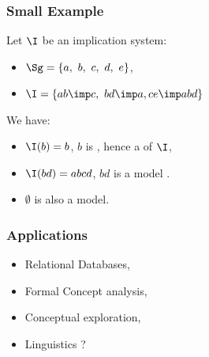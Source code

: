 \begin{frame}
\frametitle{Small Example}

Let $\I$ be an implication system:
\begin{itemize}
	\item $\Sg = \{ a, \ b, \ c, \ d, \ e \}$,
	\item $\I = \{ ab \imp c, \ bd \imp a, ce \imp abd \}$
\end{itemize}

\vspace{1.2em}

We have:
\begin{itemize}
	\item $\I(b) = b$, $b$ is , hence a  of $\I$,
	\item $\I(bd) = abcd$, $bd$ is  a model \quad 
		.
	\item $\emptyset$ is also a model.
\end{itemize}

\end{frame}

\begin{frame}
\frametitle{Applications}

\begin{itemize}
	\item Relational Databases,
	\item Formal Concept analysis,
	\item Conceptual exploration,
	\item Linguistics ?
\end{itemize}
\end{frame}



